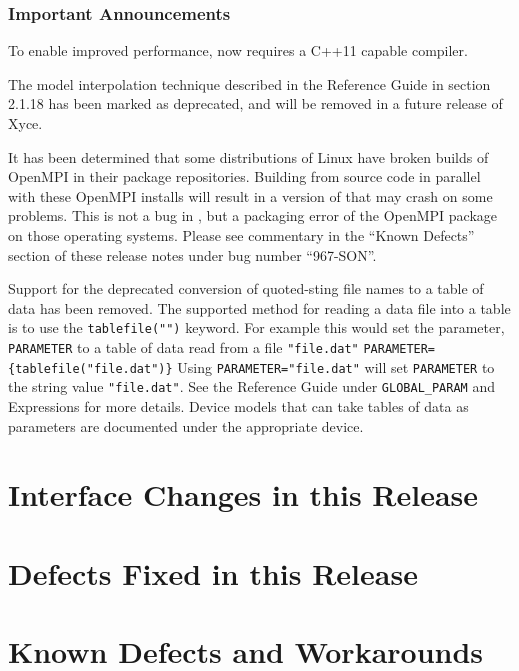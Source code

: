 \documentclass[letterpaper]{scrartcl}
\begin{document}
\subsubsection*{Important Announcements}
\begin{XyceItemize}
\item To enable improved performance, \Xyce{} now requires a C++11 capable
  compiler.
\item The model interpolation technique described in the \Xyce{}
  Reference Guide in section 2.1.18 has been marked as deprecated, and
  will be removed in a future release of Xyce.
\item It has been determined that some distributions of Linux have
  broken builds of OpenMPI in their package repositories.  Building
  \Xyce{} from source code in parallel with these OpenMPI installs
  will result in a version of \Xyce{} that may crash on some problems.
  This is not a bug in \Xyce{}, but a packaging error of the OpenMPI
  package on those operating systems.  Please see commentary in the
  ``Known Defects'' section of these release notes under bug number
  ``967-SON''.
 \item Support for the deprecated conversion of quoted-sting file 
  names to a table of data has been removed.  The supported method
  for reading a data file into a table is to use the \texttt{tablefile("")} keyword. 
  For example this would set the parameter, \texttt{PARAMETER} to a table 
  of data read from a file \texttt{"file.dat"}
  \texttt{PARAMETER=\{tablefile("file.dat")\}} 
  Using \texttt{PARAMETER="file.dat"} will set \texttt{PARAMETER} to the
  string value \texttt{"file.dat"}.  See the \Xyce{} Reference Guide
  under \texttt{GLOBAL\_PARAM} and Expressions for more details.  Device
  models that can take tables of data as parameters are documented
  under the appropriate device. 
\end{XyceItemize}

\newpage
\section{Interface Changes in this Release}


\newpage
\section{Defects Fixed in this Release}


\newpage
\section{Known Defects and Workarounds}

\end{document}
